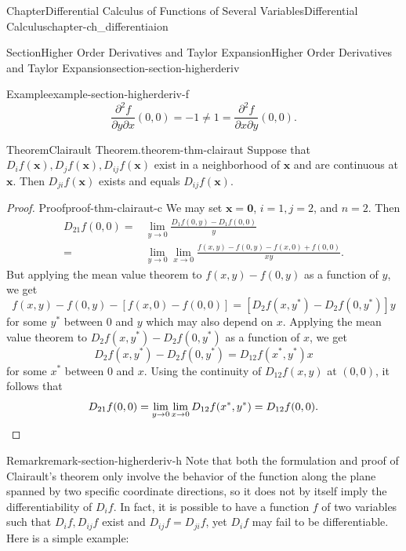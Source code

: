 \documentclass[oneside,10pt,]{book}
\numberwithin{equation}{section}
\newcommand{\qedhere}{\relax}
\newcommand{\bx}{\mathbf{x}}
\newcommand{\amp}{&}
\begin{document}
\begin{chapterptx}{Chapter}{Differential Calculus of Functions of Several Variables}{}{Differential Calculus}{}{}{chapter-ch_differentiaion}
\begin{sectionptx}{Section}{Higher Order Derivatives and Taylor Expansion}{}{Higher Order Derivatives and Taylor Expansion}{}{}{section-section-higherderiv}
\begin{example}{Example}{}{example-section-higherderiv-f}
\begin{equation*}
\frac{\partial^{2} f}{\partial y \partial x}(0, 0)=-1\ne 1= \frac{\partial^{2} f}{\partial x \partial y}(0, 0).
\end{equation*}
%
\end{example}
\begin{theorem}{Theorem}{Clairault Theorem.}{}{theorem-thm-clairaut}%
Suppose that \(D_{i}f(\bx), D_{j}f(\bx), D_{ij}f(\bx)\) exist in a neighborhood of \(\bx\) and are continuous at \(\bx\). Then \(D_{ji}f(\bx)\) exists and equals \(D_{ij}f(\bx)\).%
\end{theorem}
\begin{proof}{Proof}{}{proof-thm-clairaut-c}
We may set \(\bx=\mathbf 0\), \(i=1, j=2\), and \(n=2\). Then%
\begin{align*}
D_{21}f(0, 0)=\amp \lim_{y\to 0}\frac{D_{1}f(0, y)-D_{1}f(0, 0)}{y}\\
=\amp \lim_{y\to 0} \lim_{x\to 0}\frac{ f(x, y)-f(0, y)-f(x, 0)+f(0,0)}{xy}.
\end{align*}
But applying the mean value theorem to \(f(x, y)-f(0, y)\) as a function of \(y\), we get%
\begin{equation*}
f(x, y)-f(0, y)-[f(x, 0)-f(0, 0)]=\left[D_{2}f(x, y^{*})-D_{2}f(0, y^{*})\right]y
\end{equation*}
for some \(y^{*}\) between \(0\) and \(y\) which may also depend on \(x\). Applying the mean value theorem to \(D_{2}f(x, y^{*})-D_{2}f(0, y^{*})\) as a function of \(x\), we get%
\begin{equation*}
D_{2}f(x, y^{*})-D_{2}f(0, y^{*})=D_{12}f(x^{*}, y^{*})x
\end{equation*}
for some \(x^{*}\) between \(0\) and \(x\). Using the continuity of \(D_{12}f(x, y)\) at \((0, 0)\), it follows that%
\begin{equation*}
D_{21}f(0, 0)=\lim_{y\to 0} \lim_{x\to 0} D_{12}f(x^{*}, y^{*})=D_{12}f(0, 0).\qedhere
\end{equation*}
%
\end{proof}
\begin{remark}{Remark}{}{remark-section-higherderiv-h}%
Note that both the formulation and proof of Clairault's theorem only involve the behavior of the function along the plane spanned by two specific coordinate directions, so it does not by itself imply the differentiability of \(D_{i}f\). In fact, it is possible to have a function \(f\) of two variables such that \(D_{i}f, D_{ij}f\) exist and \(D_{ij}f=D_{ji}f\), yet \(D_{i}f\) may fail to be differentiable. Here is a simple example:%

\end{remark}
\end{sectionptx}
\end{chapterptx}
\end{document}
